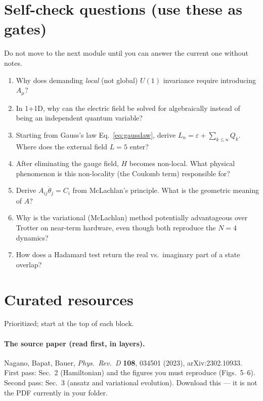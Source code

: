 \documentclass[11pt,a4paper]{article}
\begin{document}
\section{Self-check questions (use these as gates)}
Do not move to the next module until you can answer the current one without notes.
\begin{enumerate}[leftmargin=1.6em]
\item Why does demanding \emph{local} (not global) $U(1)$ invariance require introducing $A_\mu$?
\item In 1+1D, why can the electric field be solved for algebraically instead of being an independent
quantum variable?
\item Starting from Gauss's law Eq.~\eqref{eq:gausslaw}, derive $L_n=\varepsilon+\sum_{k\le n}Q_k$.
Where does the external field $L=5$ enter?
\item After eliminating the gauge field, $H$ becomes non-local. What physical phenomenon is this
non-locality (the Coulomb term) responsible for?
\item Derive $A_{ij}\dot\theta_j=C_i$ from McLachlan's principle. What is the geometric meaning of
$A$?
\item Why is the variational (McLachlan) method potentially advantageous over Trotter on near-term
hardware, even though both reproduce the $N{=}4$ dynamics?
\item How does a Hadamard test return the real vs.\ imaginary part of a state overlap?
\end{enumerate}

\section{Curated resources}
Prioritized; start at the top of each block.

\paragraph{The source paper (read first, in layers).}
Nagano, Bapat, Bauer, \emph{Phys.\ Rev.\ D} \textbf{108}, 034501 (2023), arXiv:2302.10933. First pass:
Sec.~2 (Hamiltonian) and the figures you must reproduce (Figs.~5--6). Second pass: Sec.~3 (ansatz and
variational evolution). Download this --- it is not the PDF currently in your folder.
\end{document}
